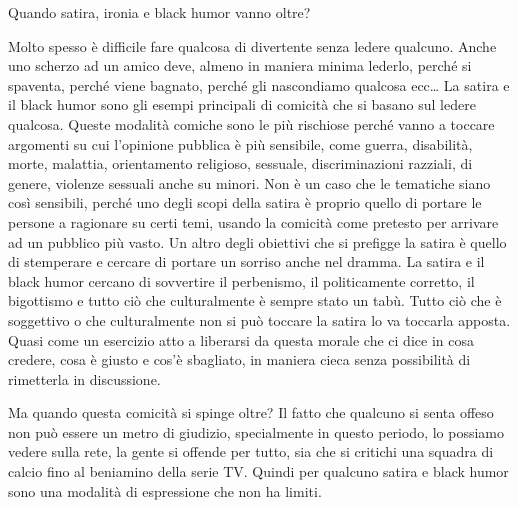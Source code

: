 \documentclass[12pt]{book} %
\begin{document}
\begin{mdframed}[linewidth=1pt]
Quando satira, ironia e black humor vanno oltre?

Molto spesso è difficile fare qualcosa di divertente senza ledere qualcuno. Anche uno scherzo ad un amico deve, almeno
in maniera minima lederlo, perché si spaventa, perché viene bagnato, perché gli nascondiamo qualcosa ecc… La satira e
il black humor sono gli esempi principali di comicità che si basano sul ledere qualcosa. Queste modalità comiche sono
le più rischiose perché vanno a toccare argomenti su cui l'opinione pubblica è più sensibile, come
guerra, disabilità, morte, malattia, orientamento religioso, sessuale, discriminazioni razziali, di genere, violenze
sessuali anche su minori. Non è un caso che le tematiche siano così sensibili, perché uno degli scopi della satira è
proprio quello di portare le persone a ragionare su certi temi, usando la comicità come pretesto per arrivare ad un
pubblico più vasto. Un altro degli obiettivi che si prefigge la satira è quello di stemperare e cercare di portare un
sorriso anche nel dramma. La satira e il black humor cercano di sovvertire il perbenismo, il politicamente corretto, il
bigottismo e tutto ciò che culturalmente è sempre stato un tabù. Tutto ciò che è soggettivo o che culturalmente non si
può toccare la satira lo va toccarla apposta. Quasi come un esercizio atto a liberarsi da questa morale che ci dice in
cosa credere, cosa è giusto e cos'è sbagliato, in maniera cieca senza possibilità di rimetterla in
discussione. 

Ma quando questa comicità si spinge oltre? Il fatto che qualcuno si senta offeso non può essere un metro di giudizio,
specialmente in questo periodo, lo possiamo vedere sulla rete, la gente si offende per tutto, sia che si critichi una
squadra di calcio fino al beniamino della serie TV. Quindi per qualcuno satira e black humor sono una modalità di
espressione che non ha limiti.


\end{mdframed}
\end{document}
